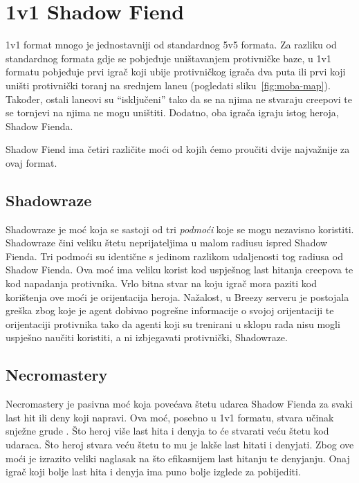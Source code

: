 \documentclass[times, utf8, zavrsni, numeric]{fer}
\begin{document}
\section{1v1 Shadow Fiend}

1v1 format mnogo je jednostavniji od standardnog 5v5 formata. Za razliku od
standardnog formata gdje se pobjeđuje uništavanjem protivničke baze, u 1v1
formatu pobjeđuje prvi igrač koji ubije protivničkog igrača dva puta ili prvi
koji uništi protivnički toranj na srednjem  laneu (pogledati
sliku~\ref{fig:moba-map}). Također, ostali laneovi su ``isključeni'' tako da se
na njima ne stvaraju creepovi te se tornjevi na njima ne mogu uništiti.
Dodatno, oba igrača igraju istog heroja, Shadow Fienda.

Shadow Fiend ima četiri različite moći od kojih ćemo proučiti dvije najvažnije
za ovaj format.

\subsection{Shadowraze}\label{shadowraze}

Shadowraze je moć koja se sastoji od tri \emph{podmoći} koje se mogu nezavisno
koristiti. Shadowraze čini veliku štetu neprijateljima u malom radiusu ispred
Shadow Fienda. Tri podmoći su identične s jedinom razlikom udaljenosti tog
radiusa od Shadow Fienda. Ova moć ima veliku korist kod uspješnog last hitanja
creepova te kod napadanja protivnika. Vrlo bitna stvar na koju igrač mora
paziti kod korištenja ove moći je orijentacija heroja. Nažalost, u Breezy
serveru je postojala greška zbog koje je agent dobivao pogrešne informacije o
svojoj orijentaciji te orijentaciji protivnika tako da agenti koji su trenirani
u sklopu rada nisu mogli uspješno naučiti koristiti, a ni izbjegavati
protivnički, Shadowraze.

\subsection{Necromastery}

Necromastery je pasivna moć koja povećava štetu udarca Shadow Fienda za svaki
last hit ili deny koji napravi. Ova moć, posebno u 1v1 formatu, stvara učinak
snježne grude .  Što heroj više last hita i denyja to će
stvarati veću štetu kod udaraca. Što heroj stvara veću štetu to mu je lakše
last hitati i denyjati. Zbog ove moći je izrazito veliki naglasak na što
efikasnijem last hitanju te denyjanju.  Onaj igrač koji bolje last hita i
denyja ima puno bolje izglede za pobijediti.
\end{document}
